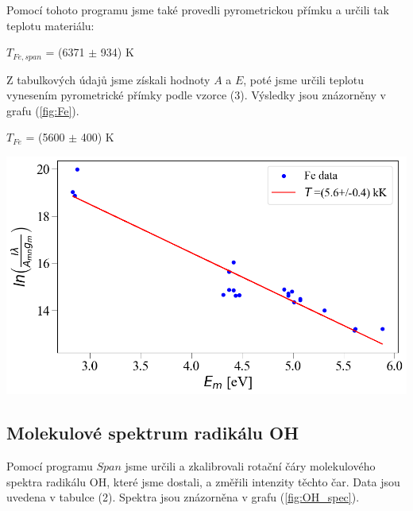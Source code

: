 \documentclass[a4paper,11pt]{article}
\begin{document}
\newpage
    \begin{minipage}[t]{0.5\textwidth} 
                \par Pomocí tohoto programu jsme také provedli pyrometrickou přímku a určili tak teplotu materiálu: 
                \begin{center}
                    $T_{Fe, span}$ = (6371 $\pm$ 934) K
                \end{center}
                Z tabulkových údajů jsme získali hodnoty $A$ a $E$, poté jsme určili teplotu vynesením pyrometrické přímky podle vzorce (3). Výsledky jsou znázorněny v grafu (\ref{fig:Fe}). 
                \begin{center}
                    $T_{Fe}$ = (5600 $\pm$ 400) K
                \end{center}

                \vspace{10pt}   
                \par \centering
                \includegraphics[scale=0.33]{Fe}
                \captionsetup{justification=centering, font=footnotesize}
                \label{fig:Fe}
                \vspace{10pt}
                \raggedright   

            \subsection{Molekulové spektrum radikálu OH}
                Pomocí programu $Span$ jsme určili a zkalibrovali rotační čáry molekulového spektra radikálu OH, které jsme dostali, a změřili intenzity těchto čar. Data jsou uvedena v tabulce (2). Spektra jsou znázorněna v grafu (\ref{fig:OH_spec}).


\end{minipage}
\end{document}

